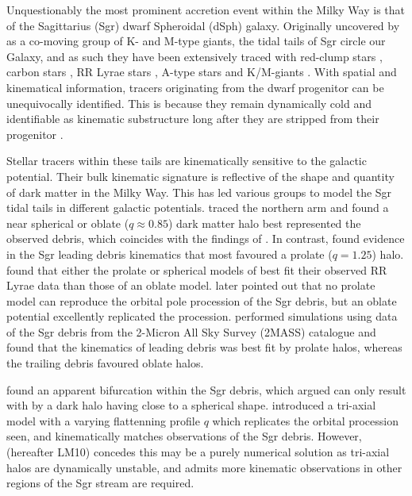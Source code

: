 \documentclass{emulateapj}
\begin{document}
	
	Unquestionably the most prominent accretion event within the Milky Way is that of the Sagittarius (Sgr) dwarf Spheroidal (dSph) galaxy. Originally uncovered by \citet{Ibata;et-al_1994} as a co-moving group of K- and M-type giants, the tidal tails of Sgr circle our Galaxy, and as such they have been extensively traced with red-clump stars \citep{Majewski;et-al_1999}, carbon stars \citep{Totten;Irwin_1998, Ibata;et-al_2001}, RR Lyrae stars \citep{Ivezic;et-al_2000, Vivas;et-al_2005, Watkins;et-al_2009, Prior;et-al_2009a}, A-type stars \citep{Newberg;et-al_2003} and K/M-giants \citep{Majewski;et-al_2003}. With spatial and kinematical information, tracers originating from the dwarf progenitor can be unequivocally identified. This is because they remain dynamically cold and identifiable as kinematic substructure long after they are stripped from their progenitor \citep{Ibata;Lewis_1998, Helmi;White_1999}. 
	
	
	Stellar tracers within these tails are kinematically sensitive to the galactic potential. Their bulk kinematic signature is reflective of the shape and quantity of dark matter in the Milky Way. This has led various groups to model the Sgr tidal tails in different galactic potentials. \citet{Martinez-Delgado;et-al_2004} traced the northern arm and found a near spherical or oblate ($q \approx 0.85$) dark matter halo best represented the observed debris, which coincides with the findings of \citet{Ibata;et-al_2001}. In contrast, \citet{Helmi_2004} found evidence in the Sgr leading debris kinematics that most favoured a prolate ($q = 1.25$) halo. \citet{Vivas;et-al_2005} found that either the prolate or spherical models of  \citet{Helmi_2004} best fit their observed RR Lyrae data than those of an oblate model. \citet{Johnston;et-al_2005} later pointed out that no prolate model can reproduce the orbital pole procession of the Sgr debris, but an oblate potential excellently replicated the procession. \citet[hereafter LJM05]{Law;et-al_2005} performed simulations using data of the Sgr debris from the 2-Micron All Sky Survey (2MASS) catalogue and found that the kinematics of leading debris was best fit by prolate halos, whereas the trailing debris favoured oblate halos. 
	
	
	\citet{Belokurov;et-al_2006} found an apparent bifurcation within the Sgr debris, which \citet{Fellhauer;et-al_2006} argued can only result with by a dark halo having close to a spherical shape. \citet{Law;et-al_2009} introduced a tri-axial model with a varying flattenning profile $q$ which replicates the orbital procession seen, and kinematically matches observations of the Sgr debris. However, \citet{Law;Majewski_2010} (hereafter LM10) concedes this may be a purely numerical solution as tri-axial halos are dynamically unstable, and admits more kinematic observations in other regions of the Sgr stream are required.
\end{document}
